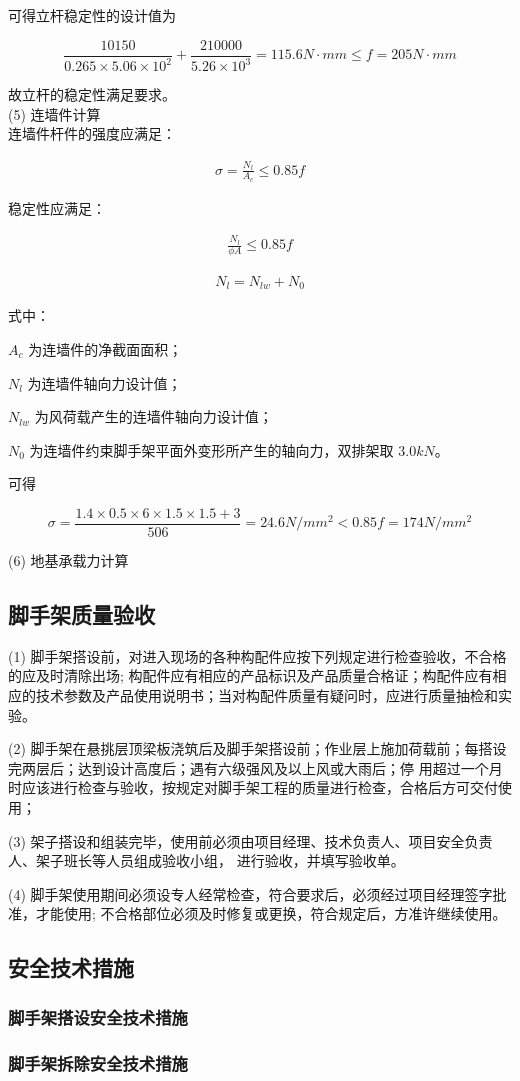 可得立杆稳定性的设计值为

$$\frac{10150}{0.265×5.06×10^2}+\frac{210000}{5.26×10^3}=115.6 N\cdot mm \leq f=205 N\cdot mm$$

故立杆的稳定性满足要求。\\

(5) 连墙件计算\\

连墙件杆件的强度应满足：

\begin{align}
    \sigma =\frac{N_l}{A_c}\leq 0.85f
\end{align}

稳定性应满足：

\begin{align}
    \frac{N_l}{\phi A}\leq 0.85f
\end{align}

\begin{align}
    N_l=N_{lw}+N_0
\end{align}

式中：

$A_c$ 为连墙件的净截面面积；  

$N_l$ 为连墙件轴向力设计值；   

$N_{lw}$ 为风荷载产生的连墙件轴向力设计值；

$N_0$ 为连墙件约束脚手架平面外变形所产生的轴向力，双排架取 $3.0kN$。

可得 

$$\sigma=\frac{1.4×0.5×6×1.5×1.5+3}{506}=24.6 N/mm^2<0.85f=174 N/mm^2$$

(6) 地基承载力计算\\

\subsection{脚手架质量验收}

(1) 脚手架搭设前，对进入现场的各种构配件应按下列规定进行检查验收，不合格的应及时清除出场;
构配件应有相应的产品标识及产品质量合格证；构配件应有相应的技术参数及产品使用说明书；当对构配件质量有疑问时，应进行质量抽检和实
验。

(2) 脚手架在悬挑层顶梁板浇筑后及脚手架搭设前；作业层上施加荷载前；每搭设完两层后；达到设计高度后；遇有六级强风及以上风或大雨后；停
用超过一个月时应该进行检查与验收，按规定对脚手架工程的质量进行检查，合格后方可交付使用；

(3) 架子搭设和组装完毕，使用前必须由项目经理、技术负责人、项目安全负责人、架子班长等人员组成验收小组，
进行验收，并填写验收单。

(4) 脚手架使用期间必须设专人经常检查，符合要求后，必须经过项目经理签字批准，才能使用;
不合格部位必须及时修复或更换，符合规定后，方准许继续使用。 

\subsection{安全技术措施}
\subsubsection{脚手架搭设安全技术措施}

\subsubsection{脚手架拆除安全技术措施}
